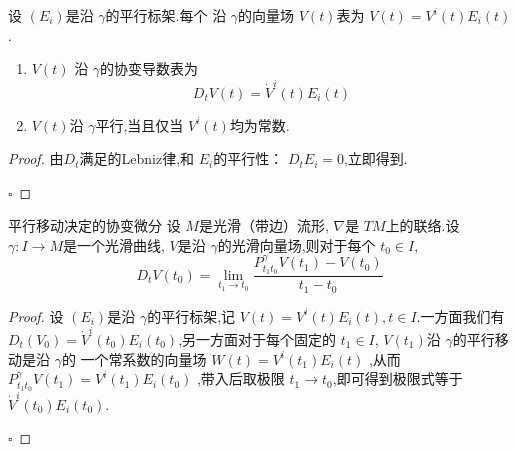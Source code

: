 \documentclass[../../main.tex]{subfiles}
\begin{document}
\begin{proposition}
    设 \(  \left( E_{i} \right)   \)是沿 \(   \gamma   \)的平行标架.每个 沿 \(   \gamma   \)的向量场 \(  V\left( t \right)   \)表为 \(  V\left( t \right)= V^{i}\left( t \right)E_{i}\left( t \right)     \).
    \begin{enumerate}
        \item \(  V\left( t \right)   \) 沿 \(   \gamma   \)的协变导数表为 \[
            D_{t}V\left( t \right)= \dot{V}^{i}\left( t \right)E_{i}\left( t \right)   
            \]      
        \item \(  V\left( t \right)   \)沿 \(   \gamma   \)平行,当且仅当 \(  V^{i}\left( t \right)   \)均为常数.   
    \end{enumerate}
    
\end{proposition}


\begin{proof}
    由\(  D_{t}  \)满足的Lebniz律,和 \(  E_{i}  \)的平行性： \(  D_{t}E_{i}= 0  \),立即得到.   

    \hfill $\square$
\end{proof}


\begin{theorem}{平行移动决定的协变微分}
    设 \(  M  \)是光滑（带边）流形,  \(   \nabla   \)是 \(  TM  \)上的联络.设 \(   \gamma :I\to M  \)是一个光滑曲线, \(  V  \)是沿 \(   \gamma   \)的光滑向量场,则对于每个 \(  t_0 \in I  \), \[
    D_{t}V\left( t_0 \right) =  \lim_{t_1\to t_0} \frac{P_{t_1t_0}^{ \gamma }V\left( t_1 \right)-V\left( t_0 \right)   }{t_1-t_0 } 
    \]       
\end{theorem}

\begin{proof}
    设 \(  \left( E_{i} \right)   \)是沿 \(   \gamma   \)的平行标架,记 \(  V\left( t \right)= V^{i}\left( t \right)E_{i}\left( t \right),t\in I     \).一方面我们有 \(  D_{t}\left( V_0 \right)= \dot{V}^{i}\left( t_0 \right)E_{i}\left( t_0 \right)     \),另一方面对于每个固定的 \(  t_1\in I  \), \(  V\left( t_1 \right)   \)沿 \(   \gamma   \)的平行移动是沿 \(   \gamma   \)的 一个常系数的向量场 \(  W\left( t \right)= V^{i}\left( t_1 \right)E_{i}\left( t \right)     \)        ,从而 \(  P_{t_1t_0}^{ \gamma }V\left( t_1 \right)= V^{i}\left( t_1 \right)E_{i}\left( t_0 \right)     \) ,带入后取极限 \(  t_1\to t_0  \),即可得到极限式等于 \(  \dot{V}^{i}\left( t_0 \right)E_{i}\left( t_0 \right)    \).  

    \hfill $\square$
\end{proof}
\end{document}
